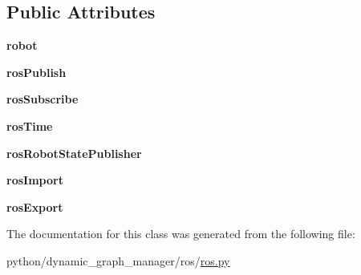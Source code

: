 \subsection*{Public Attributes}
\begin{DoxyCompactItemize}
\item 
\mbox{\label{classros_1_1ros_1_1Ros_a0befef81b5386c7b5b1ca0d13d0d2a64}} 
{\bfseries robot}
\item 
\mbox{\label{classros_1_1ros_1_1Ros_a2ddca71f44605c7268029a374070d64b}} 
{\bfseries ros\+Publish}
\item 
\mbox{\label{classros_1_1ros_1_1Ros_a31ff2a70df03c3a0283e4b8a17c019e2}} 
{\bfseries ros\+Subscribe}
\item 
\mbox{\label{classros_1_1ros_1_1Ros_a323ae5f5e4205f31f1bda8424bf534e6}} 
{\bfseries ros\+Time}
\item 
\mbox{\label{classros_1_1ros_1_1Ros_ae35fd5139c151671b1134f4725cbcc33}} 
{\bfseries ros\+Robot\+State\+Publisher}
\item 
\mbox{\label{classros_1_1ros_1_1Ros_adaf7ed0ec413adea74e298742c34b36a}} 
{\bfseries ros\+Import}
\item 
\mbox{\label{classros_1_1ros_1_1Ros_a9631d40df4f07890316cead5a94876a3}} 
{\bfseries ros\+Export}
\end{DoxyCompactItemize}


The documentation for this class was generated from the following file\+:\begin{DoxyCompactItemize}
\item 
python/dynamic\+\_\+graph\+\_\+manager/ros/\hyperlink{ros_8py}{ros.\+py}\end{DoxyCompactItemize}
